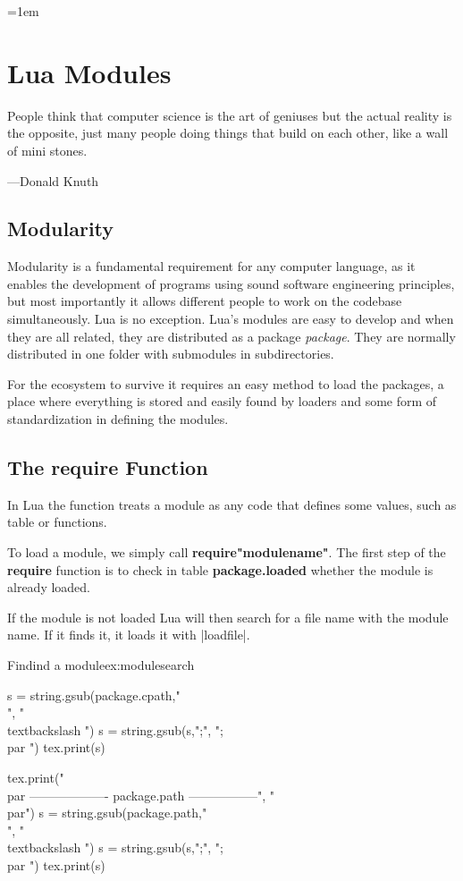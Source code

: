 
\newfontfamily{}
\def\texthiero#1{{\color{black!95}\hiero #1}}
\parindent=1em   

\chapter{Lua Modules}

\epigraph{People think that computer science is the art of geniuses but the actual reality is the opposite, just many people doing things that build on each other, like a wall of mini stones.}{---Donald Knuth}


\section{Modularity}

Modularity is a fundamental requirement for any computer language, as it enables the development of programs using sound software engineering principles, but most importantly it allows different people to work on the codebase simultaneously. Lua is no exception. Lua's modules are easy to develop and when they are all related, they are distributed as a package \textit{package}. They are normally distributed in one folder with submodules in subdirectories. 

For the ecosystem to survive it requires an easy method to load the packages, a place where everything is stored and easily found by loaders and some form of standardization in defining the modules. 

\section{The require Function}

In Lua the  function treats a module as any code that defines some values, such as table or functions. 

To load  a module, we simply call \textbf{require"modulename"}. The first step of the \textbf{require} function is to check in table \textbf{package.loaded} whether the module is already loaded.

If the module is not loaded Lua will then search for a file name with the module name. If it finds it, it loads it with |loadfile|. 


\begin{texexample}{Findind a module}{ex:modulesearch}
\begin{luacode*}
s = string.gsub(package.cpath,"\\", "\\textbackslash ")
s = string.gsub(s,";", ";\\par ")
tex.print(s)

tex.print("\\par ------------------- package.path -----------------", "\\par")
s = string.gsub(package.path,"\\", "\\textbackslash ")
s = string.gsub(s,";", ";\\par ")
tex.print(s)
\end{luacode*}
\end{texexample}



